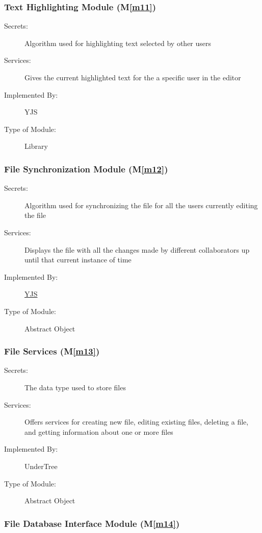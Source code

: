 \documentclass[12pt, titlepage]{article}
\newcommand{\mref}[1]{M\ref{#1}}
\begin{document}
	\subsubsection{Text Highlighting Module (\mref{m11})}
	
	\begin{description}
		\item[Secrets:] Algorithm used for highlighting text selected by other users
		\item[Services:] Gives the current highlighted text for the a specific user in the editor
		\item[Implemented By:] YJS
		\item[Type of Module:] Library
	\end{description}
	
	\subsubsection{File Synchronization Module (\mref{m12})}
	
	\begin{description}
		\item[Secrets:] Algorithm used for synchronizing the file for all the users currently editing the file
		\item[Services:] Displays the file with all the changes made by different collaborators up until that current instance of time
		\item[Implemented By:] \href{https://docs.yjs.dev/}{YJS}
		\item[Type of Module:] Abstract Object
	\end{description}
	
	\subsubsection{File Services (\mref{m13})}
	
	\begin{description}
		\item[Secrets:] The data type used to store files
		\item[Services:] Offers services for creating new file, editing existing files, deleting a file, and getting information about one or more files
		\item[Implemented By:] UnderTree
		\item[Type of Module:] Abstract Object
	\end{description}
	
	\subsubsection{File Database Interface Module (\mref{m14})}
	
\end{document}
